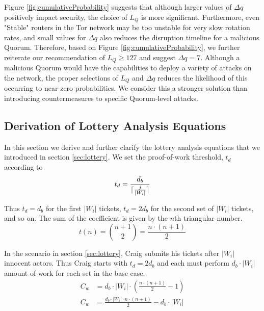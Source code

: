 \documentclass[USenglish,oneside,twocolumn]{article}
\DeclarePairedDelimiter{\ceil}{\lceil}{\rceil}
\newcommand*\nWinners{\left\vert{W_{i}}\right\vert}
\begin{document}
Figure \ref{fig:cumulativeProbability} suggests that although larger values of $ \Delta q $ positively impact security, the choice of $ L_{Q} $ is more significant. Furthermore, even "Stable" routers in the Tor network may be too unstable for very slow rotation rates, and small values for $ \Delta q $ also reduces the disruption timeline for a malicious Quorum. Therefore, based on Figure \ref{fig:cumulativeProbability}, we further reiterate our recommendation of $ L_{Q} \geq 127 $ and suggest $ \Delta q = 7 $. Although a malicious Quorum would have the capabilities to deploy a variety of attacks on the network, the proper selections of $ L_{Q} $ and $ \Delta q $ reduces the likelihood of this occurring to near-zero probabilities. We consider this a stronger solution than introducing countermeasures to specific Quorum-level attacks.

\subsection{Derivation of Lottery Analysis Equations}

In this section we derive and further clarify the lottery analysis equations that we introduced in section \ref{sec:lottery}. We set the proof-of-work threshold, $ t_{d} $ according to
\[
	t_{d} = \frac{d_{b}}{\ceil{\frac{j}{\nWinners}}}
\]

Thus $ t_{d} = d_{b} $ for the first $ \nWinners $ tickets, $ t_{d} = 2 d_{b} $ for the second set of $ \nWinners $ tickets, and so on. The sum of the coefficient is given by the $ n $th triangular number.
\[
	t(n) = \binom{n + 1}{2} = \frac{n \cdot (n + 1)}{2}
\]

In the scenario in section \ref{sec:lottery}, Craig submits his tickets after $ \nWinners $ innocent actors. Thus Craig starts with $ t_{d} = 2 d_{b} $ and each must perform $ d_{b} \cdot \nWinners $ amount of work for each set in the base case.
\begin{align*}
	C_{w} &= d_{b} \cdot \nWinners \cdot (\frac{n \cdot  (n+1)}{2} - 1) \\
	C_{w} &= \frac{d_{b} \cdot \nWinners \cdot n \cdot  (n+1)}{2} - d_{b} \cdot \nWinners
\end{align*}
\end{document}
